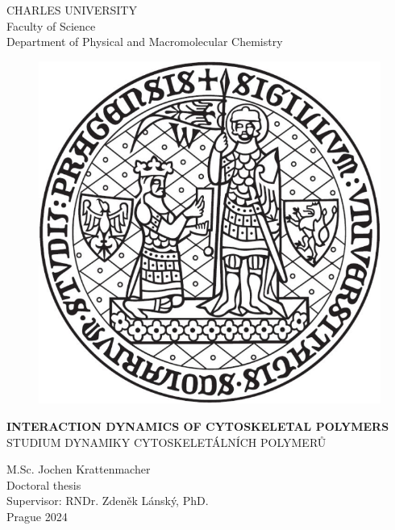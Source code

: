 \thispagestyle{empty}
\begin{center}
    \LARGE{CHARLES UNIVERSITY} \\
    \vspace{0.2in}
    \large{Faculty of Science} \\
    \vspace{0.2in}
    \large{Department of Physical and Macromolecular Chemistry} \\
    \vspace{0.4in}
    \begin{figure}[h!tb]
        \centering
        \includegraphics[scale=0.6]{Figures/CharlesU.png}
    \end{figure}
    \vspace{0.4in}
    \uppercase{\LARGE{\bf{Interaction dynamics of cytoskeletal polymers}}} \\
    \vspace{0.2in}
    \uppercase{\Large{Studium dynamiky cytoskeletálních polymerů}} \\
    \vspace{0.4in}

    \large{M.Sc. Jochen Krattenmacher} \\
    \vspace{0.1in}
    \large{Doctoral thesis} \\
    \vspace{0.1in}
    \large{Supervisor: RNDr. Zdeněk Lánský, PhD.} \\
    \vspace{0.1in}
    \large{Prague 2024}
\end{center}